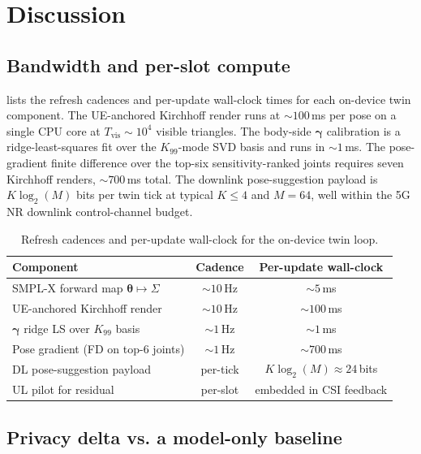 \documentclass[journal,twocolumn,10pt]{IEEEtran}
\theoremstyle{plain}
\theoremstyle{definition}
\theoremstyle{remark}
\newcommand{\thetab}{\bm{\theta}}
\begin{document}
\section{Discussion}\label{sec:discussion}

\subsection{Bandwidth and per-slot compute}\label{sec:bandwidth}

 lists the refresh cadences and per-update
wall-clock times for each on-device twin component. The
UE-anchored Kirchhoff render runs at $\sim\!100\,$ms per pose on a
single CPU core at $T_{\mathrm{vis}} \sim 10^{4}$ visible
triangles. The body-side $\bm{\gamma}$ calibration is a
ridge-least-squares fit over the $K_{99}$-mode SVD basis and runs
in $\sim\!1\,$ms. The pose-gradient finite difference over the
top-six sensitivity-ranked joints requires seven Kirchhoff
renders, $\sim\!700\,$ms total. The downlink pose-suggestion
payload is $K \log_2(M)$ bits per twin tick at typical $K \leq 4$
and $M = 64$, well within the 5G NR downlink control-channel
budget.

\begin{table}[!t]
\caption{Refresh cadences and per-update wall-clock for the
on-device twin loop.}
\label{tab:cadence}
\centering\footnotesize
\begin{tabular}{@{}l c c@{}}
\toprule
Component & Cadence & Per-update wall-clock \\
\midrule
SMPL-X forward map $\thetab \mapsto \Sigma$ & $\sim\!10\,$Hz & $\sim\!5\,$ms \\
UE-anchored Kirchhoff render & $\sim\!10\,$Hz & $\sim\!100\,$ms \\
$\bm{\gamma}$ ridge LS over $K_{99}$ basis & $\sim\!1\,$Hz & $\sim\!1\,$ms \\
Pose gradient (FD on top-6 joints) & $\sim\!1\,$Hz & $\sim\!700\,$ms \\
DL pose-suggestion payload & per-tick & $K \log_2(M) \approx 24\,$bits \\
UL pilot for residual & per-slot & embedded in CSI feedback \\
\bottomrule
\end{tabular}
\end{table}

\subsection{Privacy delta vs. a model-only baseline}
\end{document}
